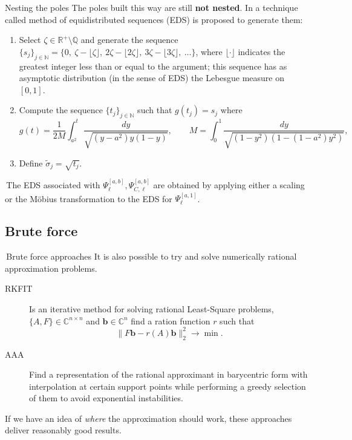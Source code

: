 \documentclass[aspectratio=169,xcolor=dvipsnames]{beamer}
\begin{document}
	\begin{frame}{Nesting the poles}
	The poles built this way are still \alert{\textbf{not nested}}. In \parencite{MR4235307} a technique called method of
	equidistributed sequences (EDS) is proposed to generate them:
	\begin{enumerate}
		\item Select $\zeta\in\mathbb R^+\setminus\mathbb Q$ and generate the sequence $\{s_j\}_{j\in\mathbb N}=\{0,\ \zeta -\lfloor\zeta\rfloor,\ 2\zeta -\lfloor2\zeta\rfloor,\ 3\zeta -\lfloor3\zeta\rfloor,\ \dots\}$, where $\lfloor\cdot\rfloor$ indicates the greatest integer less than or equal to the argument; 
		this sequence has as asymptotic distribution (in the sense of EDS) 
		the Lebesgue measure
		on $[0, 1]$. 
		\item Compute the sequence $\{t_j\}_{j\in\mathbb N}$ such that $g(t_j)=s_j$ where
		$$
		g(t)=\frac{1}{2M}\int_{a^2}^t\frac{dy}{\sqrt{(y-a^2)y(1-y)}},\qquad M=\int_0^1\frac{dy}{\sqrt{(1-y^2)(1-(1-a^2)y^2)}},
		$$
		\item Define $\widetilde \sigma_j=\sqrt{t_j}$.
	\end{enumerate}
	
	\faHammer\,The EDS associated with $\Psi_\ell^{[a,b]},\Psi_{C,\ell}^{[a,b]}$ are obtained by applying either a scaling or the M\"obius transformation to the EDS for $\Psi_{\ell}^{[a,1]}$.
	
	\end{frame}

	\subsection{Brute force}
	
	\begin{frame}{\faBomb\,Brute force approaches}
	It is also possible to try and solve numerically rational approximation problems.
	
	\begin{description}
		\item[RKFIT] \parencite{MR3702872} Is an iterative method for solving rational
		Least-Square problems, $\{A,F\} \in \mathbb{C}^{n \times n}$ and $\mathbf{b} \in \mathbb{C}^n$ find a ration function $r$ such that
		\[
		\|F\mathbf{b} - r(A)\mathbf{b}\|_2^2 \rightarrow \min.
		\] 
		\item[AAA] \parencite{MR3805855}  Find a representation of the rational approximant in barycentric form with interpolation at certain support points while performing a greedy selection of them to avoid exponential instabilities. 
	\end{description}

	If we have an idea of \emph{where} the approximation should work, these approaches deliver reasonably good results.
	
	\end{frame}
\end{document}
